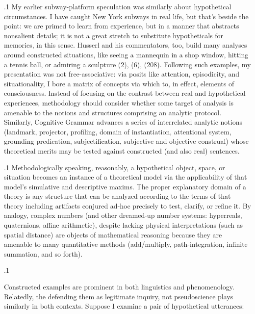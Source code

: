 \documentclass[11pt, twocolumn]{article}
\begin{document}
{{\p.1{%
My earlier subway-platform speculation was similarly about hypothetical
circumstances. I have caught New York subways in real life,
but that's beside the point: we are primed to learn from experience,
but in a manner that abstracts nonsalient details; it is not a
great stretch to substitute hypotheticals for memories, in this sense.
Husserl and his commentators, too, build many analyses around constructed situations,
like seeing a mannequin in a shop window, hitting a tennis ball,
or admiring a sculpture (2), (6),
(208). Following such examples, my presentation
was not free-associative: via posits
like attention, episodicity, and situationality, I bore a matrix of
concepts via which to, in effect,  elements of consciousness.
Instead of focusing on the contrast between real and hypothetical
experiences, methodology should consider whether some target of
analysis is amenable to the notions and structures comprising an
analytic protocol. Similarly, Cognitive Grammar advances a series of interrelated
analytic notions (landmark, projector, profiling, domain of instantiation,
attentional system, grounding predication,
subjectification, subjective and objective construal)
whose theoretical merits may be tested against constructed (and also real) sentences.
}%

\p.1{%
Methodologically speaking, reasonably, a hypothetical object, space, or situation becomes
an instance of a theoretical model via the applicability of
that model's simulative and descriptive maxims. The proper explanatory
domain of a theory is any structure that can be analyzed
according to the terms of that theory \mdash{} including artifacts
conjured ad-hoc precisely to test, clarify, or refine it.
By analogy, complex numbers (and other dreamed-up number systems:
hyperreals, quaternions, affine arithmetic), despite
lacking physical interpretations (such as spatial distance)
are objects of mathematical reasoning because they are
amenable to many quantitative methods (add/multiply,
path-integration, infinite summation, and so forth).
}%

\p.1{%
Constructed examples are prominent in both linguistics
and phenomenology. Relatedly, the 
\mdash{} defending them as legitimate inquiry, not pseudoscience
\mdash{} plays similarly in both contexts. Suppose I examine a
pair of hypothetical utterances:

\begin{exsGroup}


\end{exsGroup}}}}
\end{document}

